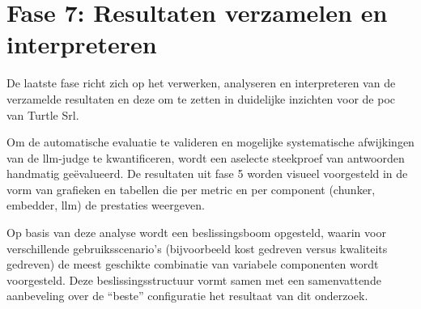 \section{Fase 7: Resultaten verzamelen en interpreteren}

De laatste fase richt zich op het verwerken, analyseren en interpreteren van de verzamelde resultaten en deze om te zetten in duidelijke inzichten voor de \gls{poc} van Turtle Srl.

Om de automatische evaluatie te valideren en mogelijke systematische afwijkingen van de \gls{llm}-judge te kwantificeren, wordt een aselecte steekproef van antwoorden handmatig geëvalueerd. De resultaten uit fase 5 worden visueel voorgesteld in de vorm van grafieken en tabellen die per metric en per component (chunker, embedder, \gls{llm}) de prestaties weergeven.

Op basis van deze analyse wordt een beslissingsboom opgesteld, waarin voor verschillende gebruiksscenario’s (bijvoorbeeld kost gedreven versus kwaliteits gedreven) de meest geschikte combinatie van variabele componenten wordt voorgesteld. Deze beslissingsstructuur vormt samen met een samenvattende aanbeveling over de ``beste'' configuratie het resultaat van dit onderzoek.
